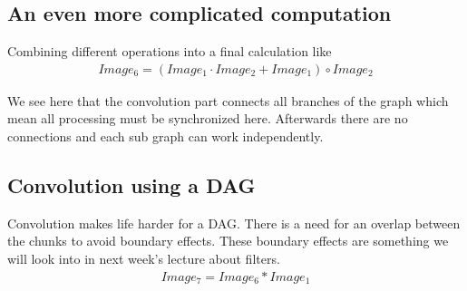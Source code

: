\documentclass[letterpaper,10pt,english]{sphinxmanual}
\begin{document}
\noindent{}


\subsection{An even more complicated computation}
\label{\detokenize{01-Introduction:an-even-more-complicated-computation}}
\sphinxAtStartPar
Combining different operations into a final calculation like
\begin{equation*}
\begin{split}Image_6=(Image_1\cdot{}Image_2+Image_1)\circ{}Image_2\end{split}
\end{equation*}
\begin{sphinxVerbatim}[commandchars=\\\{\}]
   
\end{sphinxVerbatim}

\noindent{}

\sphinxAtStartPar
We see here that the convolution part connects all branches of the graph which mean all processing must be synchronized here. Afterwards there are no connections and each sub graph can work independently.


\subsection{Convolution using a DAG}
\label{\detokenize{01-Introduction:convolution-using-a-dag}}
\sphinxAtStartPar
Convolution makes life harder for a DAG. There is a need for an overlap between the chunks to avoid boundary effects. These boundary effects are something we will look into in next week’s lecture about filters.
\begin{equation*}
\begin{split}Image_7=Image_6*Image_1\end{split}
\end{equation*}
\begin{sphinxVerbatim}[commandchars=\\\{\}]
   
   
\end{sphinxVerbatim}
\end{document}
